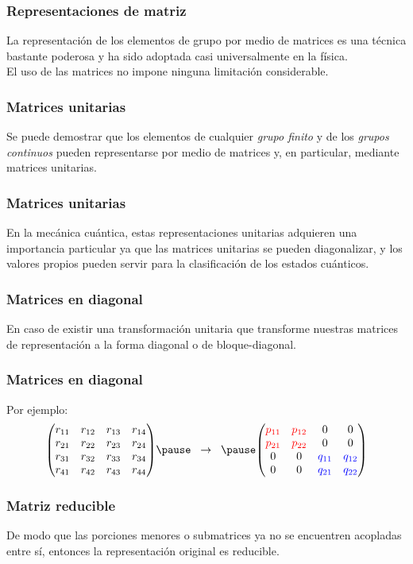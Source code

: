 \documentclass[12pt]{beamer}
\begin{document}
\begin{frame}
\frametitle{Representaciones de matriz}
La representación de los elementos de grupo por medio de matrices es una técnica bastante poderosa y ha sido adoptada casi universalmente en la física.
\\
\bigskip
\pause
El uso de las matrices no impone ninguna limitación considerable.
\end{frame}
\begin{frame}
\frametitle{Matrices unitarias}
Se puede demostrar que los elementos de cualquier \emph{grupo finito} y de los \emph{grupos continuos} pueden representarse por medio de matrices y, en particular, mediante matrices unitarias.
\end{frame}
\begin{frame}
\frametitle{Matrices unitarias}
En la mecánica cuántica, estas representaciones unitarias adquieren una importancia particular ya que las matrices unitarias se pueden diagonalizar, y los valores propios pueden servir para la clasificación de los estados cuánticos.
\end{frame}
\begin{frame}
\frametitle{Matrices en diagonal}
En caso de existir una transformación unitaria que transforme nuestras matrices de representación a la forma diagonal o de bloque-diagonal.
\end{frame}
\begin{frame}
\frametitle{Matrices en diagonal}
Por ejemplo:
\begin{eqnarray}
\mqty(
r_{11} & r_{12} & r_{13} & r_{14} \\
r_{21} & r_{22} & r_{23} & r_{24} \\
r_{31} & r_{32} & r_{33} & r_{34} \\
r_{41} & r_{42} & r_{43} & r_{44} ) \pause \hspace{0.2cm} \to \hspace{0.2cm} \pause \mqty(
\textcolor{red}{p_{11}} & \textcolor{red}{p_{12}} & 0 & 0 \\
\textcolor{red}{p_{21}} & \textcolor{red}{p_{22}} & 0 & 0 \\
0 & 0 & \textcolor{blue}{q_{11}} & \textcolor{blue}{q_{12}} \\
0 & 0 & \textcolor{blue}{q_{21}} & \textcolor{blue}{q_{22}} )
\label{eq:ecucion_04_186}
\end{eqnarray}
\end{frame}
\begin{frame}
\frametitle{Matriz reducible}
De modo que las porciones menores o submatrices ya no se encuentren
acopladas entre sí, \pause entonces la representación original es \textcolor{deepblue}{reducible}.
\end{frame}
\end{document}
